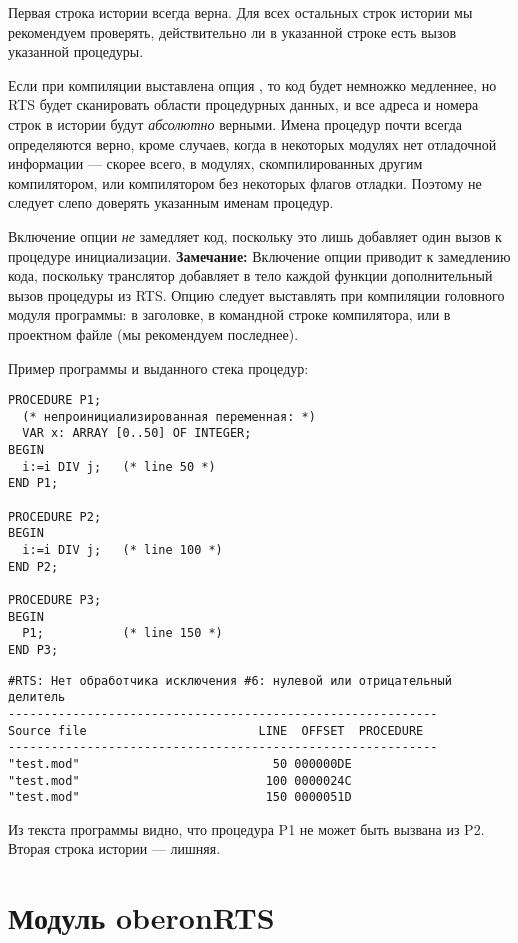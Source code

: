 Первая строка истории всегда верна. Для всех остальных строк истории мы
рекомендуем проверять, действительно ли в указанной строке есть вызов
указанной процедуры.

Если при компиляции выставлена опция , то код будет 
немножко медленнее, но RTS будет сканировать области процедурных данных,
и все адреса и номера строк в истории будут {\em абсолютно} верными.
Имена процедур почти всегда определяются верно, кроме случаев, когда
в некоторых модулях нет отладочной информации --- скорее всего, в 
модулях, скомпилированных другим компилятором, или компилятором
\XDS{} без некоторых флагов отладки. Поэтому не следует слепо
доверять указанным именам процедур.

Включение опции  {\em не} замедляет код, поскольку
это лишь добавляет один вызов к процедуре инициализации.
\else %
{\bf Замечание:} Включение опции  приводит к замедлению
кода, поскольку транслятор добавляет в тело каждой функции дополнительный
вызов процедуры из RTS.
\fi
Опцию  следует выставлять при компиляции головного 
модуля программы: в заголовке, в командной строке компилятора, или
в проектном файле (мы рекомендуем последнее).

Пример программы и выданного стека процедур:
\begin{verbatim}
PROCEDURE P1;
  (* непроинициализированная переменная: *)
  VAR x: ARRAY [0..50] OF INTEGER;
BEGIN
  i:=i DIV j;   (* line 50 *)
END P1;

PROCEDURE P2;
BEGIN
  i:=i DIV j;   (* line 100 *)
END P2;

PROCEDURE P3;
BEGIN
  P1;           (* line 150 *)
END P3;
\end{verbatim}

\begin{verbatim}
#RTS: Нет обработчика исключения #6: нулевой или отрицательный делитель
------------------------------------------------------------
Source file                        LINE  OFFSET  PROCEDURE
------------------------------------------------------------
"test.mod"                           50 000000DE
"test.mod"                          100 0000024C
"test.mod"                          150 0000051D
\end{verbatim}
Из текста программы видно, что процедура 
P1 не может быть вызвана из
P2. Вторая строка истории --- лишняя.

\section{Модуль oberonRTS}\label{rts:oberonRTS}

